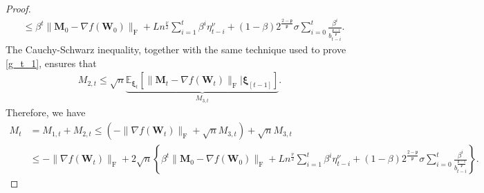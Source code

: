 \documentclass[10pt,a4paper]{amsart}
\begin{document}
\begin{proof}
\begin{align*}
&\leq
\beta^t \| \bm{M}_{0} - \nabla f(\bm{W}_{0}) \|_{\mathrm{F}}
+ L n^{\frac{\nu}{2}} \sum_{i=1}^t \beta^i \eta_{t-i}^\nu 
+ (1 - \beta) 2^{\frac{2 - \mathfrak{p}}{\mathfrak{p}}} \sigma
\sum_{i=0}^t 
\frac{\beta^i}{b_{t-i}^{\frac{\mathfrak{p} -1}{\mathfrak{p}}}}.
\end{align*}
The Cauchy-Schwarz inequality, together with the same technique used to prove \eqref{g_t_1}, ensures that 
\begin{align}\label{m_t_2} 
M_{2,t} \leq \sqrt{n} 
\underbrace{\mathbb{E}_{\bm{\xi}_t} \left[ \| \bm{M}_t - \nabla f(\bm{W}_t) \|_{\mathrm{F}} | \bm{\xi}_{[t-1]} \right]}_{M_{3,t}}.
\end{align}
Therefore, we have 
\begin{align*}
M_t 
&= M_{1,t} + M_{2,t}
\leq 
\left(- \| \nabla f (\bm{W}_t) \|_{\mathrm{F}}
+ \sqrt{n} M_{3,t} \right) 
+ \sqrt{n} M_{3,t}\\
&\leq 
- \| \nabla f (\bm{W}_t) \|_{\mathrm{F}}
+ 2 \sqrt{n}
\left\{  
\beta^t \| \bm{M}_{0} - \nabla f(\bm{W}_{0}) \|_{\mathrm{F}}
+ L n^{\frac{\nu}{2}} \sum_{i=1}^t \beta^i \eta_{t-i}^\nu 
+ (1 - \beta) 2^{\frac{2 - \mathfrak{p}}{\mathfrak{p}}} \sigma
\sum_{i=0}^t 
\frac{\beta^i}{b_{t-i}^{\frac{\mathfrak{p} -1}{\mathfrak{p}}}}
\right\}.
\end{align*}
 


\end{proof}
\end{document}
